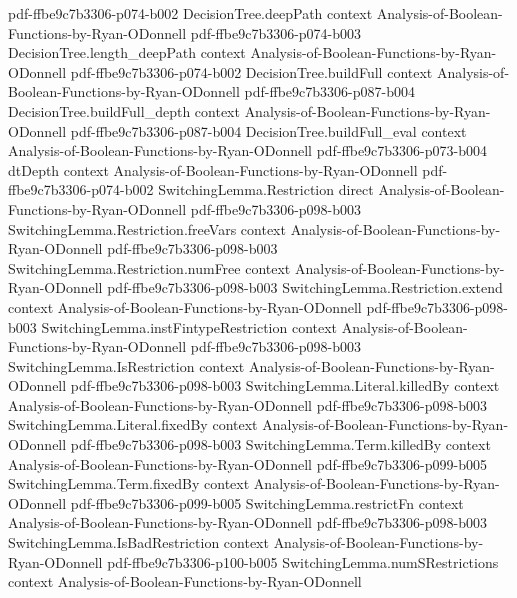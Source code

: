 \begin{lemma}
  {pdf-ffbe9c7b3306-p074-b002}
\proofstep
  {DecisionTree.deepPath}
  {context}
  {Analysis-of-Boolean-Functions-by-Ryan-ODonnell}
  {pdf-ffbe9c7b3306-p074-b003}
\proofstep
  {DecisionTree.length_deepPath}
  {context}
  {Analysis-of-Boolean-Functions-by-Ryan-ODonnell}
  {pdf-ffbe9c7b3306-p074-b002}
\proofstep
  {DecisionTree.buildFull}
  {context}
  {Analysis-of-Boolean-Functions-by-Ryan-ODonnell}
  {pdf-ffbe9c7b3306-p087-b004}
\proofstep
  {DecisionTree.buildFull_depth}
  {context}
  {Analysis-of-Boolean-Functions-by-Ryan-ODonnell}
  {pdf-ffbe9c7b3306-p087-b004}
\proofstep
  {DecisionTree.buildFull_eval}
  {context}
  {Analysis-of-Boolean-Functions-by-Ryan-ODonnell}
  {pdf-ffbe9c7b3306-p073-b004}
\proofstep
  {dtDepth}
  {context}
  {Analysis-of-Boolean-Functions-by-Ryan-ODonnell}
  {pdf-ffbe9c7b3306-p074-b002}
\proofstep
  {SwitchingLemma.Restriction}
  {direct}
  {Analysis-of-Boolean-Functions-by-Ryan-ODonnell}
  {pdf-ffbe9c7b3306-p098-b003}
\proofstep
  {SwitchingLemma.Restriction.freeVars}
  {context}
  {Analysis-of-Boolean-Functions-by-Ryan-ODonnell}
  {pdf-ffbe9c7b3306-p098-b003}
\proofstep
  {SwitchingLemma.Restriction.numFree}
  {context}
  {Analysis-of-Boolean-Functions-by-Ryan-ODonnell}
  {pdf-ffbe9c7b3306-p098-b003}
\proofstep
  {SwitchingLemma.Restriction.extend}
  {context}
  {Analysis-of-Boolean-Functions-by-Ryan-ODonnell}
  {pdf-ffbe9c7b3306-p098-b003}
\proofstep
  {SwitchingLemma.instFintypeRestriction}
  {context}
  {Analysis-of-Boolean-Functions-by-Ryan-ODonnell}
  {pdf-ffbe9c7b3306-p098-b003}
\proofstep
  {SwitchingLemma.IsRestriction}
  {context}
  {Analysis-of-Boolean-Functions-by-Ryan-ODonnell}
  {pdf-ffbe9c7b3306-p098-b003}
\proofstep
  {SwitchingLemma.Literal.killedBy}
  {context}
  {Analysis-of-Boolean-Functions-by-Ryan-ODonnell}
  {pdf-ffbe9c7b3306-p098-b003}
\proofstep
  {SwitchingLemma.Literal.fixedBy}
  {context}
  {Analysis-of-Boolean-Functions-by-Ryan-ODonnell}
  {pdf-ffbe9c7b3306-p098-b003}
\proofstep
  {SwitchingLemma.Term.killedBy}
  {context}
  {Analysis-of-Boolean-Functions-by-Ryan-ODonnell}
  {pdf-ffbe9c7b3306-p099-b005}
\proofstep
  {SwitchingLemma.Term.fixedBy}
  {context}
  {Analysis-of-Boolean-Functions-by-Ryan-ODonnell}
  {pdf-ffbe9c7b3306-p099-b005}
\proofstep
  {SwitchingLemma.restrictFn}
  {context}
  {Analysis-of-Boolean-Functions-by-Ryan-ODonnell}
  {pdf-ffbe9c7b3306-p098-b003}
\proofstep
  {SwitchingLemma.IsBadRestriction}
  {context}
  {Analysis-of-Boolean-Functions-by-Ryan-ODonnell}
  {pdf-ffbe9c7b3306-p100-b005}
\proofstep
  {SwitchingLemma.numSRestrictions}
  {context}
  {Analysis-of-Boolean-Functions-by-Ryan-ODonnell}

\end{lemma}
